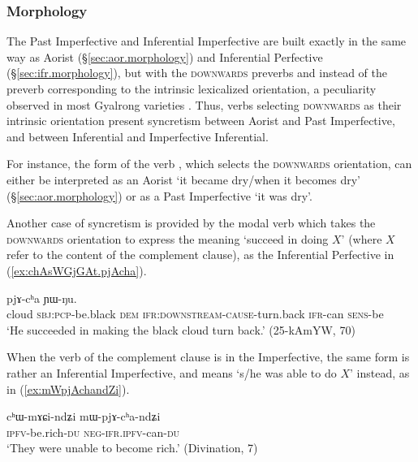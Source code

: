 \subsubsection{Morphology} \label{sec:pst.ifr.ipfv.morphology}
The Past Imperfective and Inferential Imperfective are built exactly in the same way as Aorist (§\ref{sec:aor.morphology}) and Inferential Perfective (§\ref{sec:ifr.morphology}), but with the \textsc{downwards} preverbs  and  instead of the preverb corresponding to the intrinsic lexicalized orientation, a peculiarity observed in most Gyalrong varieties \citep{lin11direction}. Thus, verbs selecting \textsc{downwards} as their intrinsic orientation present syncretism between Aorist and Past Imperfective, and between Inferential and Imperfective Inferential.

For instance, the form  of the verb , which selects the \textsc{downwards} orientation, can either be interpreted as an Aorist `it became dry/when it becomes dry' (§\ref{sec:aor.morphology}) or as a Past Imperfective `it was dry'.

Another case of syncretism is provided by the modal verb  which takes the \textsc{downwards} orientation to express the meaning `succeed in doing $X$' (where $X$ refer to the content of the complement clause), as the Inferential Perfective  in (\ref{ex:chAsWGjGAt.pjAcha}).

\begin{exe}
\ex \label{ex:chAsWGjGAt.pjAcha}
 pjɤ-cʰa ɲɯ-ŋu. \\
cloud \textsc{sbj}:\textsc{pcp}-be.black \textsc{dem} \textsc{ifr}:\textsc{downstream}-\textsc{cause}-turn.back \textsc{ifr}-can \textsc{sens}-be \\
\glt `He succeeded in making the black cloud turn back.' (25-kAmYW, 70)
\end{exe}

When the verb of the complement clause is in the Imperfective, the same form  is rather an Inferential Imperfective, and means `s/he was able to do $X$' instead, as in (\ref{ex:mWpjAchandZi}).

\begin{exe}
\ex \label{ex:mWpjAchandZi}
\gll cʰɯ-mɤɕi-ndʑi mɯ-pjɤ-cʰa-ndʑi \\
\textsc{ipfv}-be.rich-\textsc{du} \textsc{neg}-\textsc{ifr}.\textsc{ipfv}-can-\textsc{du} \\
\glt `They were unable to become rich.' (Divination, 7)
\end{exe}

